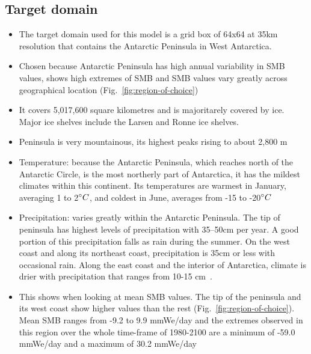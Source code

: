 \documentclass[a4paper,11pt,oneside]{report}
\begin{document}
\subsection{Target domain}
\begin{itemize}
    \item The target domain used for this model is a grid box of 64x64 at 35km resolution that contains the Antarctic Peninsula in West Antarctica. 
    \item Chosen because Antarctic Peninsula has high annual variability in SMB values, shows high extremes of SMB and SMB values vary greatly across geographical location (Fig.~\ref{fig:region-of-choice})
    \item It covers 5,017,600 square kilometres and is majoritarely covered by ice. Major ice shelves include the Larsen and Ronne ice shelves. 
    \item Peninsula is very mountainous, its highest peaks rising to about 2,800 m
    \item Temperature: because the Antarctic Peninsula, which reaches north of the Antarctic Circle, is the most northerly part of Antarctica, it has the mildest climates within this continent. Its temperatures are warmest in January, averaging 1 to 2$\degree C$, and coldest in June, averages from -15 to -20$\degree C$
    \item Precipitation: varies greatly within the Antarctic Peninsula. The tip of peninsula has highest levels of precipitation with 35–50cm per year. A good portion of this precipitation falls as rain during the summer. On the west coast and along its northeast coast, precipitation is 35cm or less with occasional rain. Along the east coast and the interior of Antarctica, climate is drier with precipitation that ranges from 10-15 cm~\cite{antarctic-climate, antarctic-climate-2}.
    \item This shows when looking at mean SMB values. The tip of the peninsula and its west coast show higher values than the rest (Fig.~\ref{fig:region-of-choice}). Mean SMB ranges from -9.2 to 9.9 mmWe/day and the extremes observed in this region over the whole time-frame of 1980-2100 are a minimum of -59.0 mmWe/day and a maximum of 30.2 mmWe/day
\end{itemize}
\end{document}
